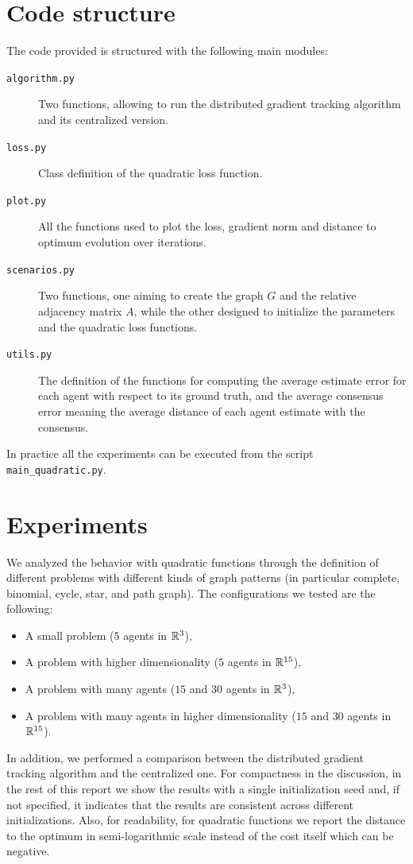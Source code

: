 \documentclass[a4paper,11pt,oneside]{book}
\begin{document}
\section{Code structure}
The code provided is structured with the following main modules:
\begin{description}
      \item[\texttt{algorithm.py}] Two functions, allowing to run the distributed gradient tracking algorithm and its centralized version.
      \item[\texttt{loss.py}] Class definition of the quadratic loss function.
      \item[\texttt{plot.py}] All the functions used to plot the loss, gradient norm and  distance to optimum evolution over iterations.
      \item[\texttt{scenarios.py}] Two functions, one aiming to create the graph $G$ and the relative adjacency matrix $A$, while the other designed to initialize the parameters and the quadratic loss functions.
      \item[\texttt{utils.py}] The definition of the functions for computing the average estimate error for each agent with respect to its ground truth, and the average consensus error meaning the average distance of each agent estimate with the consensus. 
\end{description}
In practice all the experiments can be executed from the script \texttt{main\_quadratic.py}.


\section{Experiments}

We analyzed the behavior with quadratic functions through the definition of different problems with different kinds of graph patterns (in particular complete, binomial, cycle, star, and path graph). The configurations we tested are the following:
\begin{itemize}
      \item A small problem ($5$ agents in ${\mathbb{R}}^3$),
      \item A problem with higher dimensionality ($5$ agents in ${\mathbb{R}}^{15}$),
      \item A problem with many agents ($15$ and $30$ agents in ${\mathbb{R}}^3$),
      \item A problem with many agents in higher dimensionality ($15$ and $30$ agents in ${\mathbb{R}}^{15}$).
\end{itemize}
In addition, we performed a comparison between the distributed gradient tracking algorithm and the centralized one. For compactness in the discussion, in the rest of this report we show the results with a single initialization seed and, if not specified, it indicates that the results are consistent across different initializations. Also, for readability, for quadratic functions we report the distance to the optimum in semi-logarithmic scale instead of the cost itself which can be negative.
\end{document}
